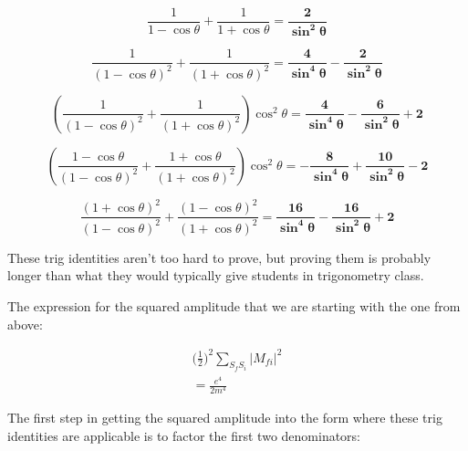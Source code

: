 \documentclass[a4]{article}
\begin{document}
    \begin{framed}

        \begin{equation}
            \frac{1}{1 - \cos \theta} + \frac{1}{1 + \cos \theta} = \mathbf{\frac{2}{\sin^2 \theta}}
        \end{equation}

        \begin{equation}
            \frac{1}{(1 - \cos \theta)^2} + \frac{1}{(1 + \cos \theta)^2} = \mathbf{\frac{4}{\sin^4 \theta} - \frac{2}{\sin^2 \theta}}
        \end{equation}

        \begin{equation}
            (\frac{1}{(1 - \cos \theta)^2} + \frac{1}{(1 + \cos \theta)^2}) \cos^2 \theta = \mathbf{\frac{4}{\sin^4 \theta} - \frac{6}{\sin^2 \theta} + 2}
        \end{equation}
 
        \begin{equation}
            (\frac{1 - \cos \theta}{(1 - \cos \theta)^2} + \frac{1 + \cos \theta}{(1 + \cos \theta)^2}) \cos^2 \theta = \mathbf{- \frac{8}{\sin^4 \theta} + \frac{10}{\sin^2 \theta} - 2}
        \end{equation}

        \begin{equation}
            \frac{(1 + \cos \theta)^2}{(1 - \cos \theta)^2} + \frac{(1 - \cos \theta)^2}{(1 + \cos \theta)^2} = \mathbf{\frac{16}{\sin^4 \theta} - \frac{16}{\sin^2 \theta} + 2}
        \end{equation}

    \end{framed}

    These trig identities aren't too hard to prove, but proving them is probably longer than what they would typically give students in trigonometry class.

    The expression for the squared amplitude that we are starting with the one from above:

    \begin{eqnarray}
        \bigg( \frac{1}{2} \bigg)^2 \sum_{S_f S_i} |M_{f i}|^2 \\
        = \frac{e^4}{2 m^4}
    \end{eqnarray}

    The first step in getting the squared amplitude into the form where these trig identities are applicable is to factor the first two denominators:
\end{document}
